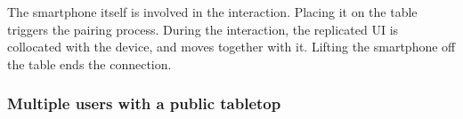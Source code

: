 The smartphone itself is involved in the interaction.
Placing it on the table triggers the pairing process.
During the interaction, the replicated UI is collocated with the device, and moves together with it.
Lifting the smartphone off the table ends the connection.




\subsubsection{Multiple users with a public tabletop}

